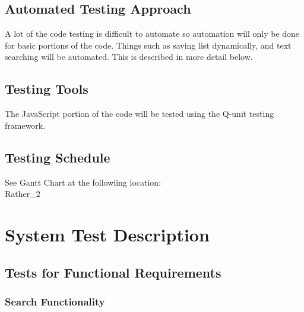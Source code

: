 \documentclass[12pt, titlepage]{article}
\begin{document}
\subsection{Automated Testing Approach}
A lot of the code testing is difficult to automate so automation will only be done for basic portions of the code. Things such as saving list dynamically, and text searching will be automated. This is described in more detail below.
\subsection{Testing Tools}
The JavaScript portion of the code will be tested using the Q-unit testing framework. 
\subsection{Testing Schedule}
		
See Gantt Chart at the followiing location: \\
Rather_2\Doc\DevelopmentPlan

\section{System Test Description}
	
\subsection{Tests for Functional Requirements}
\subsubsection{Search Functionality}
		
\end{document}
